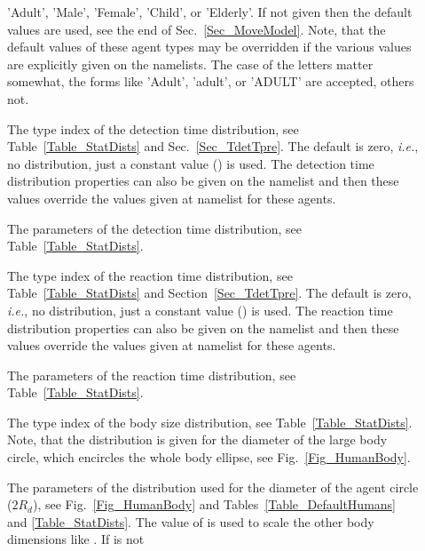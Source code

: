 \documentclass[12pt,a4paper,final,twoside]{stylevk}
\begin{document}
\begin{description}
%
\item[] 'Adult', 'Male', 'Female', 'Child',
  or 'Elderly'.  If not given then the default values are used, see
  the end of Sec.~\ref{Sec_MoveModel}.  Note, that the default values
  of these agent types may be overridden if the various values are
  explicitly given on the  namelists.  The case of the
  letters matter somewhat, the forms like 'Adult', 'adult', or 'ADULT'
  are accepted, others not.
%
\item[] The type index of the detection time
  distribution, see Table~\ref{Table_StatDists} and
  Sec.~\ref{Sec_TdetTpre}.  The default is zero, \emph{i.e.}, no
  distribution, just a constant value () is used.
  The detection time distribution properties can also be given on the
   namelist and then these values override the values
  given at  namelist for these agents.
%
\item[] The
  parameters of the detection time distribution, see
  Table~\ref{Table_StatDists}.
%
\item[] The type index of the reaction time
  distribution, see Table~\ref{Table_StatDists} and
  Section~\ref{Sec_TdetTpre}.  The default is zero, \emph{i.e.}, no
  distribution, just a constant value () is used.
  The reaction time distribution properties can also be given on the
   namelist and then these values override the values
  given at  namelist for these agents.
%
\item[] The
  parameters of the reaction time distribution, see
  Table~\ref{Table_StatDists}.
%
\item[] The type index of the body size
  distribution, see Table~\ref{Table_StatDists}.  Note, that the
  distribution is given for the diameter of the large body circle,
  which encircles the whole body ellipse, see
  Fig.~\ref{Fig_HumanBody}.
%
\item[] The
  parameters of the distribution used for the diameter of the agent
  circle ($2R_d$), see Fig.~\ref{Fig_HumanBody} and
  Tables~\ref{Table_DefaultHumans} and \ref{Table_StatDists}.  The
  value of  is used to scale the other body
  dimensions like . If  is not

\end{description}
\end{document}
